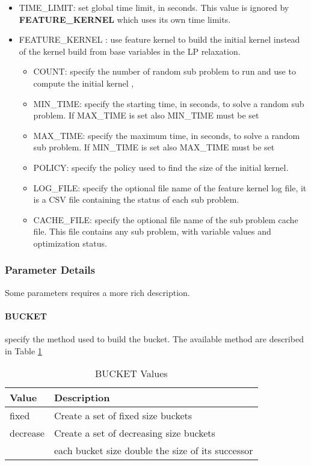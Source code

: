 \begin{itemize}
            \item TIME\_LIMIT: set global time limit, in seconds. This value is ignored by \textbf{FEATURE\_KERNEL} which uses its own time limits. 
            
            \item FEATURE\_KERNEL : use feature kernel to build the initial kernel instead of the kernel build from base variables in the LP relaxation.
            \begin{itemize}
               \item COUNT: specify the number of random sub problem to run and use to compute the initial kernel ,
               \item MIN\_TIME: specify the starting time, in seconds, to solve a random sub problem. If MAX\_TIME is set also MIN\_TIME must be set
               \item MAX\_TIME: specify the maximum time, in seconds, to solve a random sub problem. If MIN\_TIME is set also MAX\_TIME must be set
               \item POLICY: specify the policy used to find the size of the initial kernel.
               \item LOG\_FILE: specify the optional file name of the feature kernel log file, it is a CSV file containing the status of each sub problem.
               \item CACHE\_FILE: specify the optional file name of the sub problem cache file. This file contains any sub problem, with variable values and 
               optimization status.
            \end{itemize}
         \end{itemize}


        
        \subsubsection{Parameter Details}
        Some parameters requires a more rich description. 
        \paragraph{BUCKET} specify the method used to build the bucket. The available method are described in Table \ref{tab:bucket}

        \begin{table}[ht]
            \centering
           \caption{BUCKET Values}
           \begin{tabular}{|l|l|}
               \hline 
               Value & Description \\
               \hline
               \hline
               fixed & Create a set of fixed size buckets\\
               \hline
               decrease & Create a set of decreasing size buckets\\
               &  each bucket size double the size of its successor\\
               \hline
           \end{tabular}
           \label{tab:bucket}
        \end{table}

